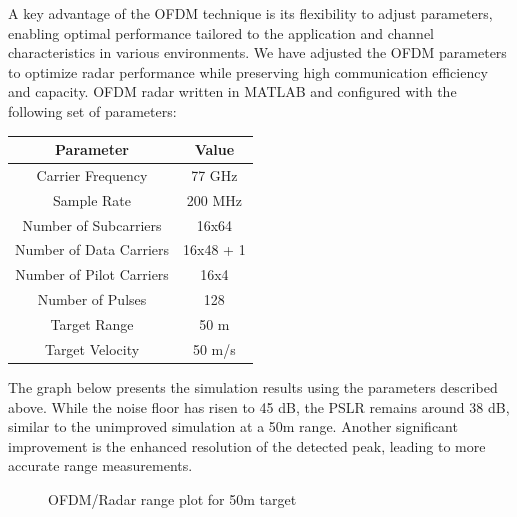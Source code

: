 \documentclass[conference]{IEEEtran}
\begin{document}
A key advantage of the OFDM technique is its flexibility to adjust parameters, enabling optimal performance tailored to the application and channel characteristics in various environments. We have adjusted the OFDM parameters to optimize radar performance while preserving high communication efficiency and capacity.
OFDM radar written in MATLAB and configured with the following set of parameters: 

\begin{center}
\begin{tabular}{|c|c|}
\hline
\textbf {Parameter} & \textbf {Value }\\
\hline
Carrier Frequency & 77 GHz \\
\hline
Sample Rate & 200 MHz \\
\hline
Number of Subcarriers & 16x64\\
\hline
Number of Data Carriers & 16x48 + 1 \\
\hline 
Number of Pilot Carriers & 16x4 \\
\hline 
Number of Pulses & 128 \\
\hline 
Target Range & 50 m \\
\hline 
Target Velocity & 50  m/s\\
\hline 
\end{tabular}
\end{center}


The graph below presents the simulation results using the parameters described above. While the noise floor has risen to 45 dB, the PSLR remains around 38 dB, similar to the unimproved simulation at a 50m range. Another significant improvement is the enhanced resolution of the detected peak, leading to more accurate range measurements.

\begin{figure}[H]
\centering
{}
\caption{OFDM/Radar range plot for 50m target}
\end{figure} 
\end{document}
